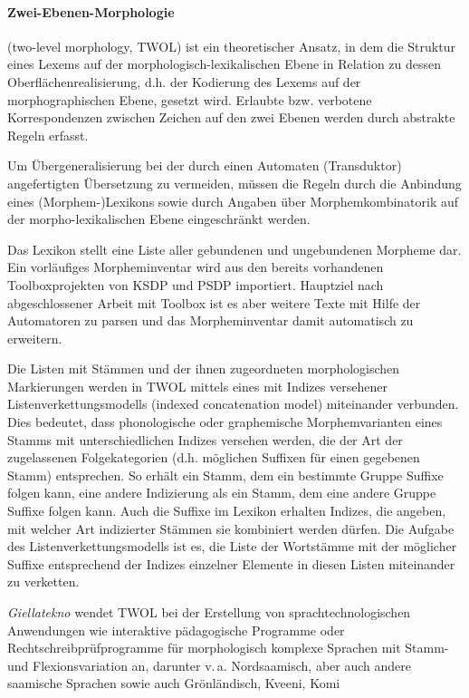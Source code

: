 \documentclass[a4paper,12pt]{article}
\begin{document}
\paragraph{Zwei-Ebenen-Morphologie} (two-level morphology, TWOL) ist ein theoretischer Ansatz, in dem die Struktur eines Lexems auf der morphologisch-lexikalischen Ebene in Relation zu dessen Oberflächenrealisierung, d.h. der Kodierung des Lexems auf der morphographischen Ebene, gesetzt wird. Erlaubte bzw. verbotene Korrespondenzen zwischen Zeichen auf den zwei Ebenen werden durch abstrakte Regeln erfasst.

Um Übergeneralisierung bei der durch einen Automaten (Transduktor) angefertigten Übersetzung zu vermeiden, müssen die Regeln durch die Anbindung eines (Morphem-)Lexikons sowie durch Angaben über Morphemkombinatorik auf der morpho-lexikalischen Ebene eingeschränkt werden.

Das Lexikon stellt eine Liste aller gebundenen und ungebundenen Morpheme dar. Ein vorläufiges Morpheminventar wird aus den bereits vorhandenen Toolboxprojekten von KSDP und PSDP importiert. Hauptziel nach abgeschlossener Arbeit mit Toolbox ist es aber weitere Texte mit Hilfe der Automatoren zu parsen und das Morpheminventar damit automatisch zu erweitern.

Die Listen mit Stämmen und der ihnen zugeordneten morphologischen Markierungen werden in TWOL mittels eines mit Indizes versehener Listenverkettungsmodells (indexed concatenation model) miteinander verbunden. Dies bedeutet, dass phonologische oder graphemische Morphemvarianten eines Stamms mit unterschiedlichen Indizes versehen werden, die der Art der zugelassenen Folgekategorien (d.h. möglichen Suffixen für einen gegebenen Stamm) entsprechen. So erhält ein Stamm, dem ein bestimmte Gruppe Suffixe folgen kann, eine andere Indizierung als ein Stamm, dem eine andere Gruppe Suffixe folgen kann. Auch die Suffixe im Lexikon erhalten Indizes, die angeben, mit welcher Art indizierter Stämmen sie kombiniert werden dürfen. Die Aufgabe des Listenverkettungsmodells ist es, die Liste der Wortstämme mit der möglicher Suffixe entsprechend der Indizes einzelner Elemente in diesen Listen miteinander zu verketten.

\textit{Giellatekno} wendet TWOL bei der Erstellung von sprachtechnologischen Anwendungen wie interaktive pädagogische Programme oder Rechtschreibprüfprogramme für morphologisch komplexe Sprachen mit Stamm- und Flexionsvariation an, darunter v.\,a. Nordsaamisch, aber auch andere saamische Sprachen sowie auch Grönländisch, Kveeni, Komi
\end{document}
